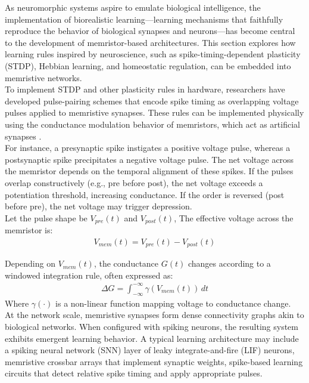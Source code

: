 As neuromorphic systems aspire to emulate biological intelligence, the implementation of biorealistic learning—learning mechanisms that faithfully reproduce the behavior of biological synapses and neurons—has become central to the development of memristor-based architectures. This section explores how learning rules inspired by neuroscience, such as spike-timing-dependent plasticity (STDP), Hebbian learning, and homeostatic regulation, can be embedded into memristive networks.\\

\noindent To implement STDP and other plasticity rules in hardware, researchers have developed pulse-pairing schemes that encode spike timing as overlapping voltage pulses applied to memristive synapses. These rules can be implemented physically using the conductance modulation behavior of memristors, which act as artificial synapses \cite{campbell2016pulse}. \\

\noindent For instance, a presynaptic spike instigates a positive voltage pulse, whereas a postsynaptic spike precipitates a negative voltage pulse. The net voltage across the memristor depends on the temporal alignment of these spikes. If the pulses overlap constructively (e.g., pre before post), the net voltage exceeds a potentiation threshold, increasing conductance. If the order is reversed (post before pre), the net voltage may trigger depression. \\

\noindent Let the pulse shape be $V_{pre}(t)$ and $V_{post}(t)$, The effective voltage across the memristor is:
\begin{align}
    V_{mem}(t) = V_{pre}(t) - V_{post}(t) \label{eq:2.34}
\end{align}

\noindent Depending on $ V_{mem}(t)$, the conductance $G(t)$ changes according to a windowed integration rule, often expressed as:
\begin{align}
    \Delta G = \int_{-\infty}^{-\infty} \gamma (V_{mem}(t)) \,dt \label{eq:2.35}
\end{align}
\noindent Where $\gamma(\cdot)$ is a non-linear function mapping voltage to conductance change. \\

\noindent At the network scale, memristive synapses form dense connectivity graphs akin to biological networks. When configured with spiking neurons, the resulting system exhibits emergent learning behavior. A typical learning architecture may include a spiking neural network (SNN) layer of leaky integrate-and-fire (LIF) neurons, memristive crossbar arrays that implement synaptic weights, spike-based learning circuits that detect relative spike timing and apply appropriate pulses.\\

